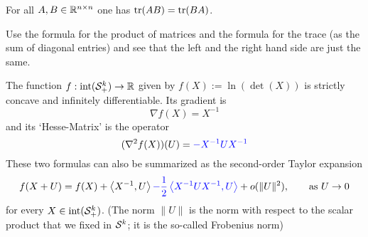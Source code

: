 \begin{exercise}
	\label{interchange}
	For all $A, B \in \mathbb{R}^{n \times n}$ one has $\operatorname{tr}(AB)=\operatorname{tr}(BA)$. 
\end{exercise}
\begin{solution}
	Use the formula for the product of matrices and the formula for the trace (as the sum of diagonal entries) and see that the left and the right hand side are just the same. 
\end{solution}

\begin{proposition}
	The function $f : \operatorname{int}(\mathcal{S}_+^k) \to \mathbb{R}$ given by $f(X) := \ln (\det (X))$ is strictly concave and infinitely differentiable. Its gradient is 
	\[
		\nabla f(X) = X^{-1}
	\]
	and its `Hesse-Matrix' is the operator
	\[
		(\nabla^2 f(X)) (U) = \textcolor{blue}{- X^{-1} U X^{-1}}
	\]
	These two formulas can also be summarized as the second-order Taylor expansion 
	\[
		f(X+U) = f(X) + \left\langle X^{-1} , U \right\rangle \textcolor{blue}{- \frac{1}{2} \left\langle X^{-1} U X^{-1}  , U \right\rangle} + o(\|U\|^2), \qquad \text{as} \ U \to 0
	\]
	for every $X \in \operatorname{int}(\mathcal{S}_+^k)$. (The norm $\|U\|$ is the norm with respect to the scalar product that we fixed in $\mathcal{S}^k$; it is the so-called Frobenius norm)
\end{proposition}
